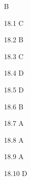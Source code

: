 \begin{Solution}{18}
B
\end{Solution}
\begin{Solution}{18.{1}}
C
\end{Solution}
\begin{Solution}{18.{2}}
B
\end{Solution}
\begin{Solution}{18.{3}}
C
\end{Solution}
\begin{Solution}{18.{4}}
D
\end{Solution}
\begin{Solution}{18.{5}}
D
\end{Solution}
\begin{Solution}{18.{6}}
B
\end{Solution}
\begin{Solution}{18.{7}}
A
\end{Solution}
\begin{Solution}{18.{8}}
A
\end{Solution}
\begin{Solution}{18.{9}}
A
\end{Solution}
\begin{Solution}{18.{10}}
D
\end{Solution}
